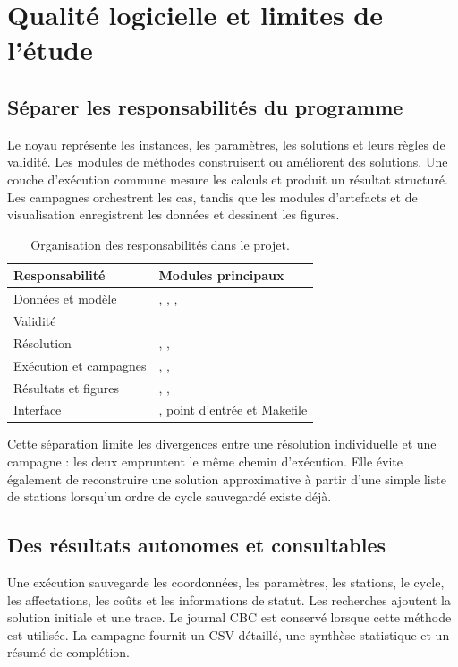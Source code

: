 \chapter{Qualité logicielle et limites de l'étude}\label{chap:qualite}
\section{Séparer les responsabilités du programme}
Le noyau représente les instances, les paramètres, les solutions et leurs
règles de validité. Les modules de méthodes construisent ou améliorent des
solutions. Une couche d'exécution commune mesure les calculs et produit un
résultat structuré. Les campagnes orchestrent les cas, tandis que les modules
d'artefacts et de visualisation enregistrent les données et dessinent les figures.

\begin{table}[htbp]\small
\begin{tabularx}{\textwidth}{lL}\toprule
Responsabilité & Modules principaux \\\midrule
Données et modèle & , , ,  \\
Validité &  \\
Résolution & , ,  \\
Exécution et campagnes & , ,  \\
Résultats et figures & , ,  \\
Interface & , point d'entrée  et Makefile \\
\bottomrule\end{tabularx}
\caption{Organisation des responsabilités dans le projet.}
\end{table}

Cette séparation limite les divergences entre une résolution individuelle
et une campagne : les deux empruntent le même chemin d'exécution. Elle
évite également de reconstruire une solution approximative à partir d'une
simple liste de stations lorsqu'un ordre de cycle sauvegardé existe déjà.

\section{Des résultats autonomes et consultables}
Une exécution sauvegarde les coordonnées, les paramètres, les stations,
le cycle, les affectations, les coûts et les informations de statut.
Les recherches ajoutent la solution initiale et une trace. Le journal CBC
est conservé lorsque cette méthode est utilisée. La campagne fournit un
CSV détaillé, une synthèse statistique et un résumé de complétion.


